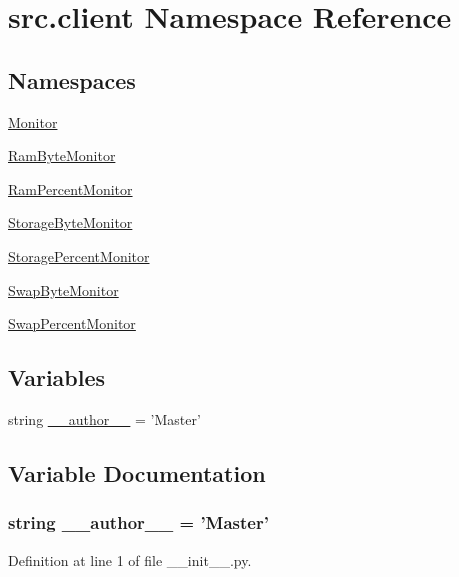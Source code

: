 \hypertarget{namespacesrc_1_1client}{\section{src.\-client Namespace Reference}
\label{namespacesrc_1_1client}
}
\subsection*{Namespaces}
\begin{DoxyCompactItemize}
\item 
\hyperlink{namespacesrc_1_1client_1_1_monitor}{Monitor}
\item 
\hyperlink{namespacesrc_1_1client_1_1_ram_byte_monitor}{Ram\-Byte\-Monitor}
\item 
\hyperlink{namespacesrc_1_1client_1_1_ram_percent_monitor}{Ram\-Percent\-Monitor}
\item 
\hyperlink{namespacesrc_1_1client_1_1_storage_byte_monitor}{Storage\-Byte\-Monitor}
\item 
\hyperlink{namespacesrc_1_1client_1_1_storage_percent_monitor}{Storage\-Percent\-Monitor}
\item 
\hyperlink{namespacesrc_1_1client_1_1_swap_byte_monitor}{Swap\-Byte\-Monitor}
\item 
\hyperlink{namespacesrc_1_1client_1_1_swap_percent_monitor}{Swap\-Percent\-Monitor}
\end{DoxyCompactItemize}
\subsection*{Variables}
\begin{DoxyCompactItemize}
\item 
string \hyperlink{namespacesrc_1_1client_a629d61dfe4da763164a4d1a2d85b0afd}{\-\_\-\-\_\-author\-\_\-\-\_\-} = 'Master'
\end{DoxyCompactItemize}


\subsection{Variable Documentation}
\hypertarget{namespacesrc_1_1client_a629d61dfe4da763164a4d1a2d85b0afd}{
\subsubsection[{\-\_\-\-\_\-author\-\_\-\-\_\-}]{\setlength{\rightskip}{0pt plus 5cm}string \-\_\-\-\_\-author\-\_\-\-\_\- = 'Master'}}\label{namespacesrc_1_1client_a629d61dfe4da763164a4d1a2d85b0afd}


Definition at line 1 of file \-\_\-\-\_\-init\-\_\-\-\_\-.\-py.

